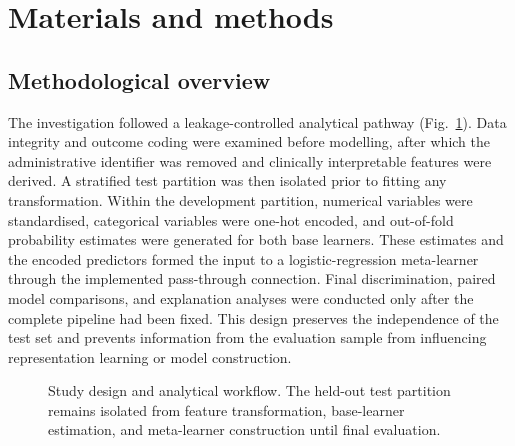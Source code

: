 ﻿\documentclass[preprint,12pt]{elsarticle}
\begin{document}
\section{Materials and methods}
\subsection{Methodological overview}
The investigation followed a leakage-controlled analytical pathway (Fig.~\ref{fig:workflow}). Data integrity and outcome coding were examined before modelling, after which the administrative identifier was removed and clinically interpretable features were derived. A stratified test partition was then isolated prior to fitting any transformation. Within the development partition, numerical variables were standardised, categorical variables were one-hot encoded, and out-of-fold probability estimates were generated for both base learners. These estimates and the encoded predictors formed the input to a logistic-regression meta-learner through the implemented pass-through connection. Final discrimination, paired model comparisons, and explanation analyses were conducted only after the complete pipeline had been fixed. This design preserves the independence of the test set and prevents information from the evaluation sample from influencing representation learning or model construction.

\begin{figure}[H]
\centering
{}
\caption{Study design and analytical workflow. The held-out test partition remains isolated from feature transformation, base-learner estimation, and meta-learner construction until final evaluation.}
\label{fig:workflow}
\end{figure}
\end{document}
